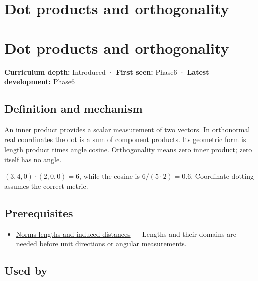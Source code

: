 \hypertarget{appendix-8bc4e8fc547c}{}
\section*{Dot products and orthogonality}
\section{Dot products and orthogonality}\label{dot-products-and-orthogonality}

\textbf{Curriculum depth:} Introduced · \textbf{First seen:} Phase6 · \textbf{Latest development:} Phase6

\subsection{Definition and mechanism}\label{definition-and-mechanism}

An inner product provides a scalar measurement of two vectors. In orthonormal real coordinates the dot is a sum of component products. Its geometric form is length product times angle cosine. Orthogonality means zero inner product; zero itself has no angle.

\((3,4,0)\cdot(2,0,0)=6\), while the cosine is \(6/(5\cdot2)=0.6\). Coordinate dotting assumes the correct metric.

\subsection{Prerequisites}\label{prerequisites}

\begin{itemize}
\tightlist
\item
  \hyperref[appendix-49933872bb51]{Norms lengths and induced distances} --- Lengths and their domains are needed before unit directions or angular measurements.
\end{itemize}

\subsection{Used by}\label{used-by}

